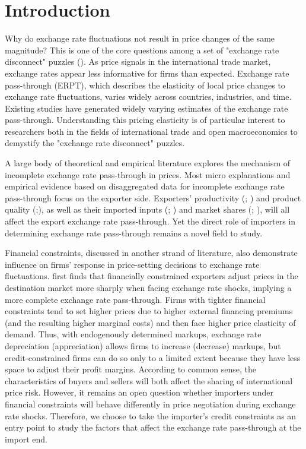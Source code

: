 \chapter{Introduction}\label{sec-1.introduction}

Why do exchange rate fluctuations not result in price changes of the same magnitude? This is one of the core questions among a set of "exchange rate disconnect" puzzles (\cite{obstfeld2000}). As price signals in the international trade market, exchange rates appear less informative for firms than expected. Exchange rate pass-through (ERPT), which describes the elasticity of local price changes to exchange rate fluctuations, varies widely across countries, industries, and time. Existing studies have generated widely varying estimates of the exchange rate pass-through. Understanding this pricing elasticity is of particular interest to researchers both in the fields of international trade and open macroeconomics to demystify the "exchange rate disconnect" puzzles.

A large body of theoretical and empirical literature explores the mechanism of incomplete exchange rate pass-through in prices. Most micro explanations and empirical evidence based on disaggregated data for incomplete exchange rate pass-through focus on the exporter side. Exporters' productivity (\cite{bmm2012}; \cite{lmx2015}) and product quality (\cite{chen2016};\cite{auer2018}), as well as their imported inputs (\cite{aik2014}; \cite{wang-yu2021}) and market shares (\cite{auer2016}; \cite{devereux2017}), will all affect the export exchange rate pass-through. Yet the direct role of importers in determining exchange rate pass-through remains a novel field to study. 

Financial constraints, discussed in another strand of literature, also demonstrate influence on firms’ response in price-setting decisions to exchange rate fluctuations. \cite{strasser2013} first finds that financially constrained exporters adjust prices in the destination market more sharply when facing exchange rate shocks, implying a more complete exchange rate pass-through. Firms with tighter financial constraints tend to set higher prices due to higher external financing premiums (and the resulting higher marginal costs) and then face higher price elasticity of demand. Thus, with endogenously determined markups, exchange rate depreciation (appreciation) allows firms to increase (decrease) markups, but credit-constrained firms can do so only to a limited extent because they have less space to adjust their profit margins. According to common sense, the characteristics of buyers and sellers will both affect the sharing of international price risk. However, it remains an open question whether importers under financial constraints will behave differently in price negotiation during exchange rate shocks. Therefore, we choose to take the importer's credit constraints as an entry point to study the factors that affect the exchange rate pass-through at the import end.

